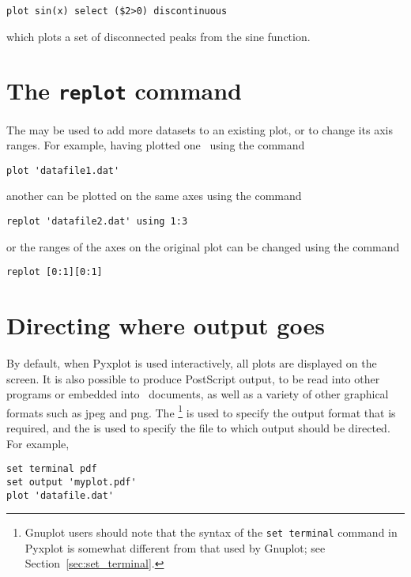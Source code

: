 \begin{verbatim}
plot sin(x) select ($2>0) discontinuous
\end{verbatim}

\noindent which plots a set of disconnected peaks from the sine function.

\section{The {\tt replot} command}
\label{sec:replot}

The  may be used to add more datasets to an existing plot, or
to change its axis ranges. For example, having plotted one \datafile\ using the
command

\begin{verbatim}
plot 'datafile1.dat'
\end{verbatim}

\noindent another can be plotted on the same axes using the command

\begin{verbatim}
replot 'datafile2.dat' using 1:3
\end{verbatim}

\noindent or the ranges of the axes on the original plot can be changed using
the command

\begin{verbatim}
replot [0:1][0:1]
\end{verbatim}

\section{Directing where output goes}
\label{sec:directing_output}

By default, when Pyxplot is used interactively, all plots are displayed on the
screen. It is also possible to produce PostScript output, to be read into other
programs or embedded into \latexdcf\ documents, as well as a variety of other
graphical formats such as jpeg and png. The \footnote{Gnuplot users should note that the syntax of the {\tt set
terminal} command in Pyxplot is somewhat different from that used by Gnuplot;
see Section~\ref{sec:set_terminal}.} is used to specify the output format that
is required, and the  is used to specify the file to which
output should be directed. For example,

\begin{verbatim}
set terminal pdf
set output 'myplot.pdf'
plot 'datafile.dat'
\end{verbatim}

